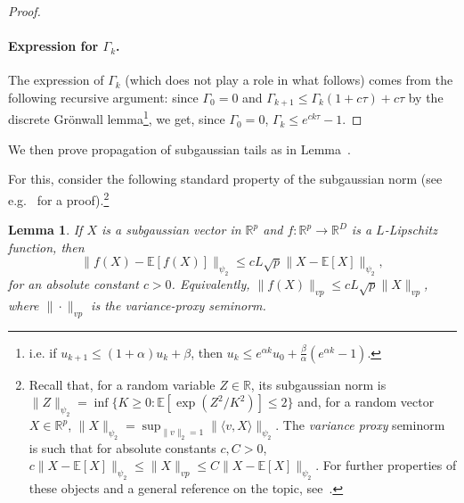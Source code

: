 \documentclass[a4paper,11pt]{article}
\newcommand{\R}{\mathbb{R}}
\newcommand{\1}{\mathbbm{1}}
\newcommand{\E}{\mathbb{E}}
\newtheorem{lemma}[theorem]{Lemma}
\theoremstyle{definition}
\theoremstyle{remark}
\begin{document}
\begin{proof}
\paragraph{Expression for $\Gamma_k$.}
The expression of $\Gamma_k$ (which does not play a role in what follows) comes from the following recursive argument: since $\Gamma_0 = 0$ and $\Gamma_{k+1} \leq \Gamma_k(1 + c\tau) + c\tau$ by the discrete Grönwall lemma\footnote{i.e. if $u_{k+1} \leq (1+\alpha)u_k + \beta$, then $u_k \leq e^{\alpha k} u_0 + \frac{\beta}{\alpha}(e^{\alpha k}-1)$. }, we get, since $\Gamma_0 = 0$,
$\Gamma_k \leq e^{ck\tau} - 1$.
\end{proof}

We then prove propagation of subgaussian tails as in Lemma~\cite[Lemma 5.3]{chizat2025hidden}. {For this, consider the following standard property of the subgaussian norm (see e.g.~\cite[Appendix A]{chizat2025hidden} for a proof).\footnote{{Recall that, for a random variable $Z\in \R$, its subgaussian norm is $\|Z\|_{\psi_2} = \inf\{K\geq0: \E[\exp(Z^2/K^2)] \leq 2\}$ and, for a random vector $X\in \R^p$, $\|X\|_{\psi_2} = \sup_{\|v\|_2=1} \|\langle v,X\rangle\|_{\psi_2}$. The \textit{variance proxy} seminorm is such that for absolute constants $c, C>0$, $c\|X-\E[X]\|_{\psi_2}\leq\|X\|_{vp}\leq C\|X-\E[X]\|_{\psi_2}$. For further properties of these objects and a general reference on the topic, see~\cite{vershynin2018highdimensionalproba}.}} 
\begin{lemma}\label{lem:subgaussian_via_lipschitz}
    If $X$ is a subgaussian vector in $\R^p$ and $f:\R^p\to \R^D$ is a $L$-Lipschitz function, then
    \[\|f(X)-\E[f(X)]\|_{\psi_2} \leq cL\sqrt{p}\|X - \E[X]\|_{\psi_2}, \]
    for an absolute constant $c>0$. Equivalently, \(\|f(X)\|_{vp} \leq cL\sqrt{p}\|X\|_{vp}\), where $\|\cdot\|_{vp}$ is the variance-proxy seminorm.
\end{lemma}
}
\end{document}

